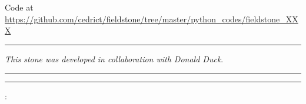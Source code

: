 \begin{center}
\inpython
Code at \url{https://github.com/cedrict/fieldstone/tree/master/python_codes/fieldstone_XXX}
\end{center}

\par\noindent\rule{\textwidth}{0.4pt}

{\sl This stone was developed in collaboration with Donald Duck}. 

\par\noindent\rule{\textwidth}{0.4pt}



\lipsum[2-4]



\par\noindent\rule{\textwidth}{0.4pt}

\vspace{.5cm}

\begin{center}
\end{center}

\vspace{.5cm}

\Literature:\\


